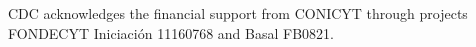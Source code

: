 \documentclass[pre,twocolumn,superscriptaddress]{revtex4}
\begin{document}
\begin{acknowledgments}

CDC acknowledges the financial support from CONICYT through projects FONDECYT Iniciaci\'on 11160768 and Basal FB0821.
\end{acknowledgments}

\end{document}
